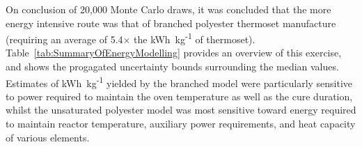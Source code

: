On conclusion of 20,000 Monte Carlo draws, it was concluded that
 the more energy intensive route was that of branched polyester
 thermoset manufacture (requiring an average of 5.4\(\times\) the 
 kWh~kg\textsuperscript{-1} of thermoset).
Table~\ref{tab:SummaryOfEnergyModelling} provides an overview of
 this exercise, and shows the progagated uncertainty bounds 
 surrounding the median values.
Estimates of kWh~kg\textsuperscript{-1} yielded by the branched 
 model were particularly sensitive to power required to
 maintain the oven temperature as well as the cure duration,
 whilst the unsaturated polyester model was most sensitive toward
 energy required to maintain reactor temperature, auxiliary power
 requirements, and heat capacity of various elements.